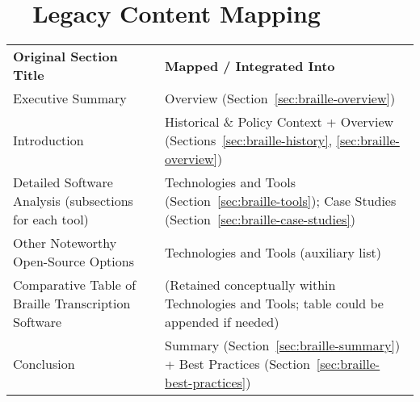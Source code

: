 \section{~~Legacy Content Mapping}
\label{sec:braille-legacy-mapping}
\begin{tabular}{p{} p{}}
	\textbf{Original Section Title}                        & \textbf{Mapped / Integrated Into}                                                                               \\
	Executive Summary                                      & Overview (Section~\ref{sec:braille-overview})                                                                   \\
	Introduction                                           & Historical \& Policy Context + Overview (Sections~\ref{sec:braille-history}, \ref{sec:braille-overview})        \\
	Detailed Software Analysis (subsections for each tool) & Technologies and Tools (Section~\ref{sec:braille-tools}); Case Studies (Section~\ref{sec:braille-case-studies}) \\
	Other Noteworthy Open-Source Options                   & Technologies and Tools (auxiliary list)                                                                         \\
	Comparative Table of Braille Transcription Software    & (Retained conceptually within Technologies and Tools; table could be appended if needed)                        \\
	Conclusion                                             & Summary (Section~\ref{sec:braille-summary}) + Best Practices (Section~\ref{sec:braille-best-practices})         \\
\end{tabular}


